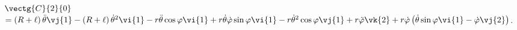 $\vectg{C}{2}{0}$ 
$ =\left(R+\ell\right)\ddot{\theta}\vj{1} -\left(R+\ell\right)\dot{\theta}^2\vi{1} 
-r\ddot{\theta}\cos\varphi \vi{1} +r\dot{\theta}\dot{\varphi}\sin\varphi \vi{1} -r\dot{\theta}^2\cos\varphi \vj{1} 
+ r\ddot{\varphi}\vk{2}+ r\dot{\varphi}\left(\dot{\theta}\sin\varphi\vi{1}- \dot{\varphi}\vj{2} \right)$.
\else
\fi

